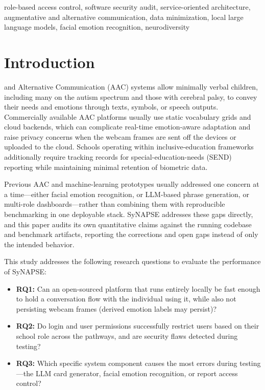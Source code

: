 \documentclass[conference]{IEEEtran}
\begin{document}
\begin{IEEEkeywords}
role-based access control, software security audit, service-oriented architecture, augmentative and alternative communication, data minimization, local large language models, facial emotion recognition, neurodiversity
\end{IEEEkeywords}

\section{Introduction}
 and Alternative Communication (AAC) systems allow minimally verbal children, including many on the autism spectrum and those with cerebral palsy, to convey their needs and emotions through texts, symbols, or speech outputs. Commercially available AAC platforms usually use static vocabulary grids and cloud backends, which can complicate real-time emotion-aware adaptation and raise privacy concerns when the webcam frames are sent off the devices or uploaded to the cloud. Schools operating within inclusive-education frameworks additionally require tracking records for special-education-needs (SEND) reporting while maintaining minimal retention of biometric data.

Previous AAC and machine-learning prototypes usually addressed one concern at a time---either facial emotion recognition, or LLM-based phrase generation, or multi-role dashboards---rather than combining them with reproducible benchmarking in one deployable stack. SyNAPSE addresses these gaps directly, and this paper audits its own quantitative claims against the running codebase and benchmark artifacts, reporting the corrections and open gaps instead of only the intended behavior.

This study addresses the following research questions to evaluate the performance of SyNAPSE:
\begin{itemize}
  \item \textbf{RQ1:} Can an open-sourced platform that runs entirely locally be fast enough to hold a conversation flow with the individual using it, while also not persisting webcam frames (derived emotion labels may persist)?
  \item \textbf{RQ2:} Do login and user permissions successfully restrict users based on their school role across the pathways, and are security flaws detected during testing?
  \item \textbf{RQ3:} Which specific system component causes the most errors during testing---the LLM card generator, facial emotion recognition, or report access control?
\end{itemize}
\end{document}
